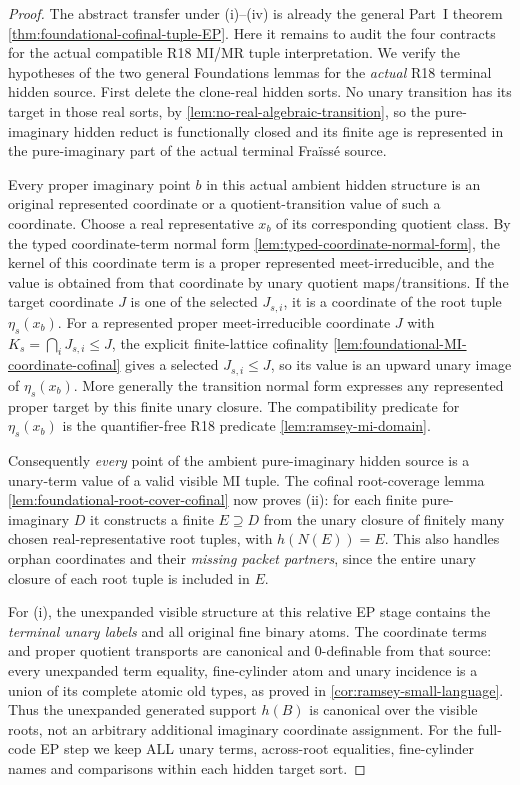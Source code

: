 \begin{proof}
The abstract transfer under (i)--(iv) is already
the general Part~I theorem
\cref{thm:foundational-cofinal-tuple-EP}.
Here it remains to audit the four
contracts for the actual compatible
R18 MI/MR tuple interpretation.
We verify the hypotheses of the two general
Foundations lemmas for the \emph{actual} R18
terminal hidden source. First delete the
clone-real hidden sorts. No unary transition
has its target in those real sorts, by
\cref{lem:no-real-algebraic-transition}, so
the pure-imaginary hidden reduct is
functionally closed and its finite age
is represented in the pure-imaginary part
of the actual terminal Fra\"iss\'e source.

Every proper imaginary point $b$ in this
actual ambient hidden structure is an
original represented coordinate or a
quotient-transition value of such a
coordinate. Choose a real representative
$x_b$ of its corresponding quotient class.
By the typed coordinate-term normal form
\cref{lem:typed-coordinate-normal-form},
the kernel of this coordinate term is a
proper represented meet-irreducible, and
the value is obtained from that coordinate
by unary quotient maps/transitions.
If the target coordinate $J$ is one of
the selected $J_{s,i}$, it is a coordinate
of the root tuple $\eta_s(x_b)$.
For a represented proper meet-irreducible
coordinate $J$ with $K_s=\bigcap_iJ_{s,i}\le J$,
the explicit finite-lattice cofinality
\cref{lem:foundational-MI-coordinate-cofinal}
gives a selected $J_{s,i}\le J$, so its
value is an upward unary image of
$\eta_s(x_b)$. More generally the
transition normal form expresses any
represented proper target by this finite
unary closure. The compatibility
predicate for $\eta_s(x_b)$ is the
quantifier-free R18 predicate
\cref{lem:ramsey-mi-domain}.

Consequently \emph{every} point of the
ambient pure-imaginary hidden source
is a unary-term value of a valid visible
MI tuple. The cofinal root-coverage lemma
\cref{lem:foundational-root-cover-cofinal}
now proves (ii): for each finite
pure-imaginary $D$ it constructs a finite
$E\supseteq D$ from the unary closure
of finitely many chosen real-representative
root tuples, with $h(N(E))=E$. This also
handles orphan coordinates and their
\emph{missing packet partners}, since
the entire unary closure of each root
tuple is included in $E$.

For (i), the unexpanded visible structure
at this relative EP stage contains the
\emph{terminal unary labels} and all
original fine binary atoms. The coordinate
terms and proper quotient transports are
canonical and $0$-definable from that
source: every unexpanded term equality,
fine-cylinder atom and unary incidence is
a union of its complete atomic old types,
as proved in \cref{cor:ramsey-small-language}.
Thus the unexpanded generated support
$h(B)$ is canonical over the visible
roots, not an arbitrary additional
imaginary coordinate assignment.
For the full-code EP step we keep ALL
unary terms, across-root equalities,
fine-cylinder names and comparisons
within each hidden target sort.


\end{proof}
